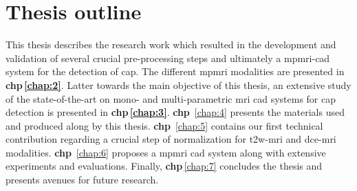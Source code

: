 \section{Thesis outline} \label{sec:intro:outline}

This thesis describes the research work which resulted in the development and validation of several crucial pre-processing steps and ultimately a \ac{mpmri}-\ac{cad} system for the detection of \ac{cap}.
The different \ac{mpmri} modalities are presented in \textbf{\acs{chp}\,\ref{chap:2}}.
Latter towards the main objective of this thesis, an extensive study of the state-of-the-art on mono- and multi-parametric \ac{mri} \ac{cad} systems for \ac{cap} detection is presented in \textbf{\acs{chp}\,\ref{chap:3}}.
\textbf{\acl{chp}}~\ref{chap:4} presents the materials used and produced along by this thesis. 
\textbf{\acl{chp}}~\ref{chap:5} contains our first technical contribution regarding a crucial step of normalization for \ac{t2w}-\ac{mri} and \ac{dce}-\ac{mri} modalities.
\textbf{\acl{chp}}~\ref{chap:6} proposes a \ac{mpmri} \ac{cad} system along with extensive experiments and evaluations.
Finally, \textbf{\acs{chp}}\,\ref{chap:7} concludes the thesis and presents avenues for future research.
